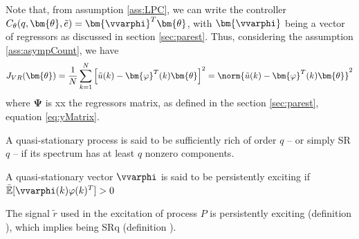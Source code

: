 Note that, from assumption \ref{ass:LPC}, we can write the controller $C_\theta(q,\bm{\theta},\tilde{e}) = \bm{\vvarphi}^{T}\bm{\theta}$, with $\bm{\vvarphi}$ being a vector of regressors as discussed in section \ref{sec:parest}. Thus, considering the assumption \ref{ass:asympCount}, we have
\begin{equation}
   J_{VR}(\bm{\theta}) = \frac{1}{N}\sum_{k=1}^{N} \left[ \tilde{u}(k) - \bm{\varphi}^{T}(k)\bm{\theta} \right]^{2} = \norm{\tilde{u}(k)-\bm{\varphi}^T(k)\bm{\theta}}^{2}
\label{eq:JVR_reg}
\end{equation}
where $\bm{\Psi}$ is xx the regressors matrix, as defined in the section \ref{sec:parest}, equation \ref{eq:yMatrix}.

\begin{defn} \label{def:SRq}
   A quasi-stationary process is said to be sufficiently rich of order $q$ -- or simply SR$q$ -- if its spectrum has at least $q$ nonzero components.
\end{defn}

\begin{defn} \label{def:PoE}
   A quasi-stationary vector $\vvarphi$ is said to be persistently exciting if $\bar{\mathbb{E}}[\vvarphi(k)\varphi(k)^{T}] > 0$
\end{defn}

\begin{assum}
   The signal $\tilde{r}$ used in the excitation of process $P$ is persistently exciting (definition \label{def:PoE}), which implies being SRq (definition \label{def:SRq}).
\end{assum}


%

